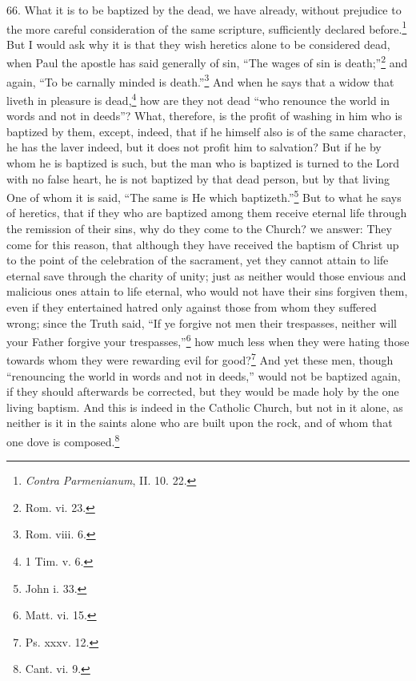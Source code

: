 66. What it is to be baptized by the dead, we have already, without prejudice to the more careful consideration of the same scripture, sufficiently declared before.\footnote{\par  \emph{Contra Parmenianum}, II. 10. 22.} But I would ask why it is that they wish heretics alone to be considered dead, when Paul the apostle has said generally of sin, ``The wages of sin is death;''\footnote{\par  Rom. vi. 23.} and again, ``To be carnally minded is death.''\footnote{\par  Rom. viii. 6.} And when he says that a widow that liveth in pleasure is dead,\footnote{\par  1 Tim. v. 6.} how are they not dead ``who renounce the world in words and not in deeds''? What, therefore, is the profit of washing in him who is baptized by them, except, indeed, that if he himself also is of the same character, he has the laver indeed, but it does not profit him to salvation? But if he by whom he is baptized is such, but the man who is baptized is turned to the Lord with no false heart, he is not baptized by that dead person, but by that living One of whom it is said, ``The same is He which baptizeth.''\footnote{\par  John i. 33.} But to what he says of heretics, that if they who are baptized among them receive eternal life through the remission of their sins, why do they come to the Church? we answer: They come for this reason, that although they have received the baptism of Christ up to the point of the celebration of the sacrament, yet they cannot attain to life eternal save through the charity of unity; just as neither would those envious and malicious ones attain to life eternal, who would not have their sins forgiven them, even if they entertained hatred only against those from whom they suffered wrong; since the Truth said, ``If ye forgive not men their trespasses, neither will your Father forgive your trespasses,''\footnote{\par  Matt. vi. 15.} how much less when they were hating those towards whom they were rewarding evil for good?\footnote{\par  Ps. xxxv. 12.} And yet these men, though ``renouncing the world in words and not in deeds,'' would not be baptized again, if they should afterwards be corrected, but they would be made holy by the one living baptism. And this is indeed in the Catholic Church, but not in it alone, as neither is it in the saints alone who are built upon the rock, and of whom that one dove is composed.\footnote{\par  Cant. vi. 9.}

